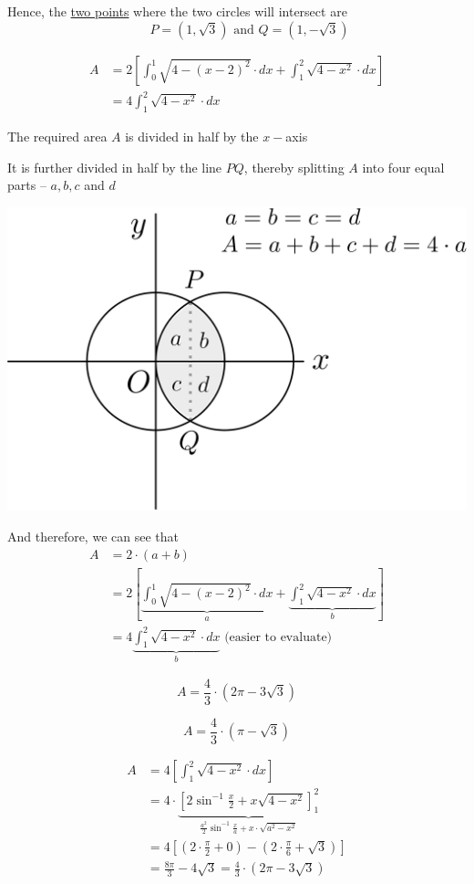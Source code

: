\documentclass[14pt,fleqn]{extarticle}
\newcommand\yone{4-x^2}
\newcommand\ytwo{4- \left(x-2 \right)^2}
\newcommand\intg{\frac{a^2}{2}\sin^{-1}\frac{x}{a}+x\cdot\sqrt{a^2-x^2}}
\begin{document}
Hence, the \underline{two points} where the two circles will intersect are 
\[ \qquad P = \left(1,\sqrt{3} \right)\text{ and } Q = \left(1,-\sqrt{3} \right)\]

\newcard

\smallmath 
\begin{align}
A &= 2 \left[\int_0^1 \sqrt{\ytwo}\cdot dx + \int_1^2 \sqrt{\yone}\cdot dx  \right] \\
&= 4\int_1^2 \sqrt{\yone}\cdot dx 
\end{align}

\newcard

The required area $A$ is divided in half by the $x-$axis \newline 

It is further divided in half by the line $PQ$, thereby splitting $A$ into 
four equal parts -- $a,b,c$ and $d$ \newline 

\begin{center}
\includegraphics[scale=0.35]{fig-2.svg} 
\end{center} 

And therefore, we can see that 
\smallmath
\begin{align}
A &= 2\cdot \left(a+b \right) \\
&= 2 \left[\underbrace{\int_0^1 \sqrt{\ytwo}\cdot dx}_{a} + \underbrace{\int_1^2 \sqrt{\yone}\cdot dx}_{b} \right] \\
&= 4 \underbrace{\int_1^2 \sqrt{\yone}\cdot dx}_{b} \text{ (easier to evaluate)}
\end{align}

\newcard 

\[ A = \frac{4}{3}\cdot \left(2\pi-3\sqrt{3} \right)\]

\newcard 

\[ A = \frac{4}{3}\cdot \left(\pi-\sqrt{3} \right)\]

\newcard 
\begin{align}
A &= 4 \left[\int_1^2 \sqrt{\yone}\cdot dx \right] \\
&= 4\cdot \underbrace{\left[2\sin^{-1}\frac{x}{2} + x\sqrt{\yone} \right]_1^2}_{\intg} \\
&= 4 \left[\left(2 \cdot\frac{\pi}{2} + 0 \right) - \left(2\cdot\frac{\pi}{6} + \sqrt{3} \right) \right] \\
&= \frac{8\pi}{3} - 4\sqrt{3} = \frac{4}{3}\cdot \left(2\pi-3\sqrt{3} \right)
\end{align}
\end{document}
